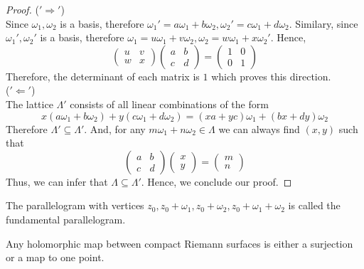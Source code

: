 \documentclass[oneside, 12pt]{scrbook}
\theoremstyle{theorem}
\begin{document}
\begin{proof}
($'\Rightarrow '$)\\
Since $\omega_{1}, \omega_{2}$ is a basis, therefore $\omega_{1}' = a\omega_{1} + b\omega_{2}, \omega_{2}' = c\omega_{1} + d\omega_{2}$. Similary, since $\omega_{1}',\omega_{2}'$ is a basis, therefore $\omega_{1} = u\omega_{1} + v\omega_{2},\omega_{2} = w\omega_{1} + x\omega_{2}'$. Hence, $$\begin{pmatrix}
u & v \\ w & x
\end{pmatrix}\begin{pmatrix}
a & b \\ c & d
\end{pmatrix} = \begin{pmatrix}
1 & 0 \\ 0 & 1
\end{pmatrix}$$
Therefore, the determinant of each matrix is $1$ which proves this direction. \\

($'\Leftarrow'$)\\
The lattice $\Lambda '$ consists of all linear combinations of the form $$x(a\omega_{1} + b \omega_{2}) + y (c \omega_{1} + d \omega_{2}) = (xa+yc) \omega_{1} + (bx + dy)\omega_{2}$$ Therefore $\Lambda ' \subseteq \Lambda '$. And, for any $m \omega_{1} + n \omega_{2} \in \Lambda $ we can always find $(x,y)$ such that $$\begin{pmatrix}
a & b \\ c& d
\end{pmatrix} \begin{pmatrix}
x \\ y
\end{pmatrix} = \begin{pmatrix}
m \\ n
\end{pmatrix} $$
Thus, we can infer that $\Lambda \subseteq \Lambda '$. Hence, we conclude our proof.
\end{proof}

\begin{definition}
The parallelogram with vertices $z_{0}, z_{0} + \omega_{1}, z_{0} + \omega_{2} , z_{0} + \omega_{1} + \omega_{2}$ is called the fundamental parallelogram.
\end{definition}

\begin{lemma}
Any holomorphic map between compact Riemann surfaces is either a surjection or a map to one point.
\end{lemma}
\end{document}
